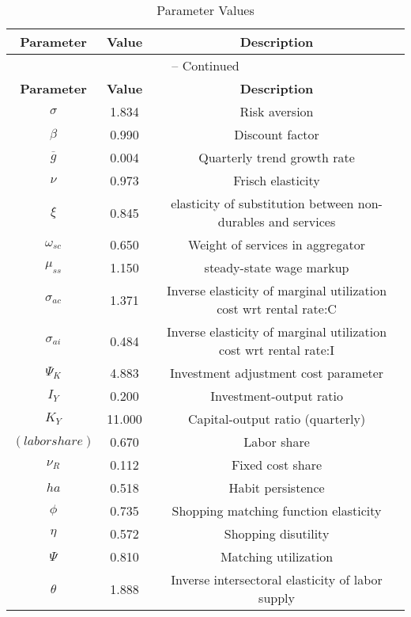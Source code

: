 \begin{center}
\begin{longtable}{ccc}
\caption{Parameter Values}\\%
\toprule%
\multicolumn{1}{c}{\textbf{Parameter}} &
\multicolumn{1}{c}{\textbf{Value}} &
 \multicolumn{1}{c}{\textbf{Description}}\\%
\midrule%
\endfirsthead
\multicolumn{3}{c}{{\tablename} \thetable{} -- Continued}\\%
\midrule%
\multicolumn{1}{c}{\textbf{Parameter}} &
\multicolumn{1}{c}{\textbf{Value}} &
  \multicolumn{1}{c}{\textbf{Description}}\\%
\midrule%
\endhead
${\sigma}$ 	 & 	 1.834 	 & 	 Risk aversion\\
${\beta}$ 	 & 	 0.990 	 & 	 Discount factor\\
${\overline{g}}$ 	 & 	 0.004 	 & 	 Quarterly trend growth rate\\
$\nu$ 	 & 	 0.973 	 & 	 Frisch elasticity\\
$\xi$ 	 & 	 0.845 	 & 	 elasticity of substitution between non-durables and services\\
$\omega_{sc}$ 	 & 	 0.650 	 & 	 Weight of services in aggregator\\
$\mu_{ss}$ 	 & 	 1.150 	 & 	 steady-state wage markup\\
${\sigma_{ac}}$ 	 & 	 1.371 	 & 	 Inverse elasticity of marginal utilization cost wrt rental rate:C\\
${\sigma_{ai}}$ 	 & 	 0.484 	 & 	 Inverse elasticity of marginal utilization cost wrt rental rate:I\\
${\Psi_{K}}$ 	 & 	 4.883 	 & 	 Investment adjustment cost parameter\\
${I_Y}$ 	 & 	 0.200 	 & 	 Investment-output ratio\\
${K_Y}$ 	 & 	 11.000 	 & 	 Capital-output ratio (quarterly)\\
$(labor share)$ 	 & 	 0.670 	 & 	 Labor share\\
${\nu_R}$ 	 & 	 0.112 	 & 	 Fixed cost share\\
${ha}$ 	 & 	 0.518 	 & 	 Habit persistence\\
${\phi}$ 	 & 	 0.735 	 & 	 Shopping matching function elasticity\\
${\eta}$ 	 & 	 0.572 	 & 	 Shopping disutility\\
${\Psi}$ 	 & 	 0.810 	 & 	 Matching utilization\\
${\theta}$ 	 & 	 1.888 	 & 	 Inverse intersectoral elasticity of labor supply\\

\end{longtable}
\end{center}
